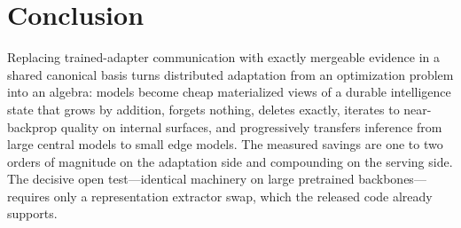 \documentclass[11pt]{article}
\begin{document}
\section{Conclusion}
Replacing trained-adapter communication with exactly mergeable evidence
in a shared canonical basis turns distributed adaptation from an
optimization problem into an algebra: models become cheap materialized
views of a durable intelligence state that grows by addition, forgets
nothing, deletes exactly, iterates to near-backprop quality on internal
surfaces, and progressively transfers inference from large central
models to small edge models. The measured savings are one to two orders
of magnitude on the adaptation side and compounding on the serving side.
The decisive open test---identical machinery on large pretrained
backbones---requires only a representation extractor swap, which the
released code already supports.
\end{document}
